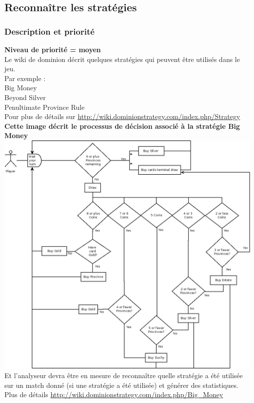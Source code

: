 \documentclass{scrreprt}
\begin{document}
\subsection{Reconnaître les stratégies}
\subsubsection{Description et priorité}
\textbf{Niveau de priorité = moyen}\\

Le wiki de dominion décrit quelques stratégies qui peuvent être utilisés dans le jeu.\\Par exemple :\\
Big Money\\
Beyond Silver\\
Penultimate Province Rule\\
Pour plus de détails sur \url{http://wiki.dominionstrategy.com/index.php/Strategy}\\



\textbf{Cette image décrit le processus de décision associé à la stratégie Big Money}\\
\includegraphics[width=\textwidth,height=\textheight,keepaspectratio]{diaRessources/big-money}\\
Et l'analyseur devra être en mesure de reconnaître quelle stratégie a été utilisée sur un match donné (si une  stratégie a été utilisée) et générer des statistiques.\\
Plus de détails \url{http://wiki.dominionstrategy.com/index.php/Big_Money}\\
\end{document}
